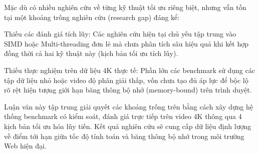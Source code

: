 
Mặc dù có nhiều nghiên cứu về từng kỹ thuật tối ưu riêng biệt, nhưng vẫn tồn tại một khoảng trống nghiên cứu (research gap) đáng kể:


Thiếu các đánh giá tích lũy: Các nghiên cứu hiện tại chủ yếu tập trung vào SIMD hoặc Multi-threading đơn lẻ mà chưa phân tích sâu hiệu quả khi kết hợp đồng thời cả hai kỹ thuật này (kịch bản tối ưu tích lũy).


Thiếu thực nghiệm trên dữ liệu 4K thực tế: Phần lớn các benchmark sử dụng các tập dữ liệu nhỏ hoặc video độ phân giải thấp, vốn chưa tạo đủ áp lực để bộc lộ rõ rệt hiện tượng giới hạn băng thông bộ nhớ (memory-bound) trên trình duyệt.


Luận văn này tập trung giải quyết các khoảng trống trên bằng cách xây dựng hệ thống benchmark có kiểm soát, đánh giá trực tiếp trên video 4K thông qua 4 kịch bản tối ưu hóa lũy tiến. Kết quả nghiên cứu sẽ cung cấp dữ liệu định lượng về điểm tới hạn giữa tốc độ tính toán và băng thông bộ nhớ trong môi trường Web hiện đại.
